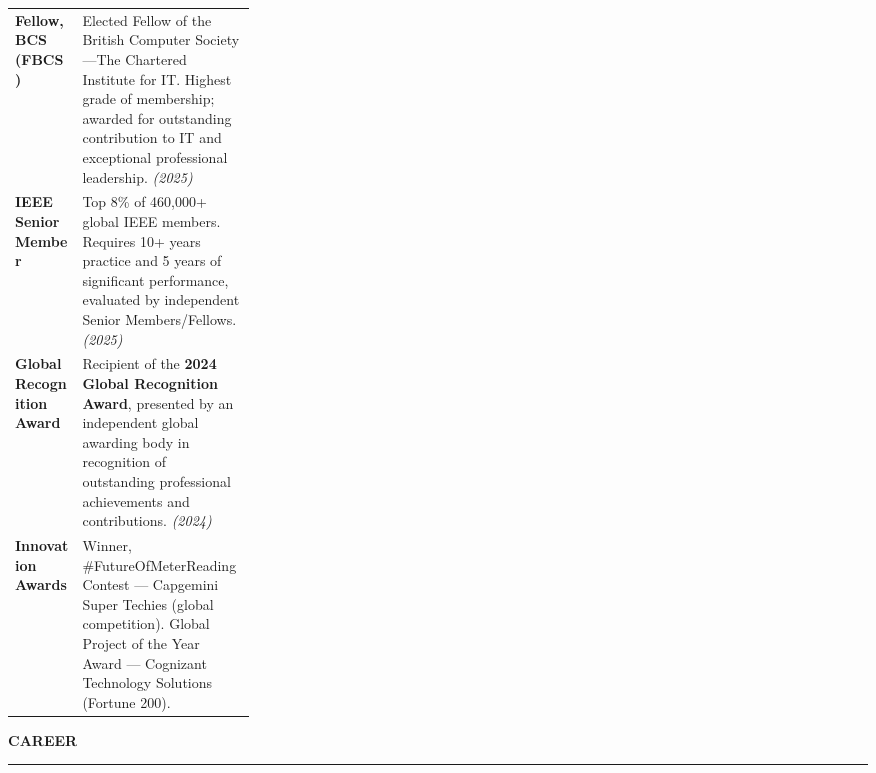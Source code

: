 \documentclass[10pt, letterpaper]{article}
\newcommand{\sect}[1]{%
  \vspace{7pt}%
  {\small\bfseries\color{navy}\MakeUppercase{#1}}%
  \vspace{1pt}%
  {\color{rulegray}\hrule height 0.9pt}%
  \vspace{4pt}%
}
\begin{document}
\vspace{1pt}
\begin{tabularx}{\linewidth}{@{}p{0.28\linewidth}X@{}}

  \textbf{\small\color{navy}Fellow, BCS (FBCS)} &
  {\small Elected Fellow of the British Computer Society---The Chartered Institute for IT.
  Highest grade of membership; awarded for outstanding contribution to IT and exceptional
  professional leadership. \textit{(2025)}}\\[4pt]

  \textbf{\small\color{navy}IEEE Senior Member} &
  {\small Top 8\% of 460,000+ global IEEE members. Requires 10+ years practice and 5 years
  of significant performance, evaluated by independent Senior Members/Fellows. \textit{(2025)}}\\[4pt]

  \textbf{\small\color{navy}Global Recognition Award} &
  {\small Recipient of the \textbf{2024 Global Recognition Award}, presented by an independent global awarding body in recognition of outstanding professional achievements and contributions. \textit{(2024)}}\\[4pt]

  \textbf{\small\color{navy}Innovation Awards} &
  {\small Winner, \#FutureOfMeterReading Contest --- Capgemini Super Techies (global
  competition). Global Project of the Year Award --- Cognizant Technology Solutions
  (Fortune 200).}\\

\end{tabularx}

\sect{Career}
\end{document}
